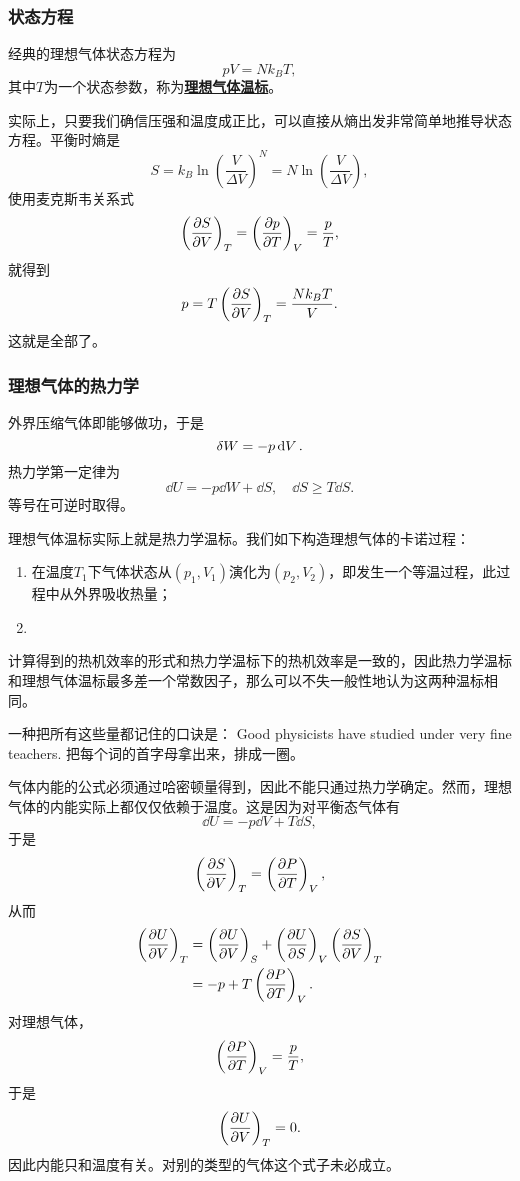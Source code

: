 \documentclass[hyperref, UTF8, a4paper]{ctexart}
\newcommand{\concept}[1]{\underline{\textbf{#1}}}
\begin{document}
\subsubsection{状态方程}

经典的理想气体状态方程为
\begin{equation}
    pV=N k_B T,
\end{equation}
其中$T$为一个状态参数，称为\concept{理想气体温标}。

实际上，只要我们确信压强和温度成正比，可以直接从熵出发非常简单地推导状态方程。平衡时熵是
\[
    S = k_B \ln \left(\frac{V}{\Delta V}\right)^N = N \ln \left( \frac{V}{\Delta V} \right),
\]
使用麦克斯韦关系式
\[
    \left( \pdv{S}{V} \right)_T = \left( \pdv{p}{T} \right)_V = \frac{p}{T},
\]
就得到
\[
    p = T \left( \pdv{S}{V} \right)_T = \frac{N k_B T}{V}.
\]
这就是全部了。

\subsubsection{理想气体的热力学}

外界压缩气体即能够做功，于是
\begin{equation}
    \var{W} = - p \dd{V}.
\end{equation}
热力学第一定律为
\begin{equation}
    \dd{U} = - p \dd{W} + \dd{S}, \quad \dd{S} \geq T \dd{S}.
\end{equation}
等号在可逆时取得。

理想气体温标实际上就是热力学温标。我们如下构造理想气体的卡诺过程：
\begin{enumerate}
    \item 在温度$T_1$下气体状态从$(p_1, V_1)$演化为$(p_2, V_2)$，即发生一个等温过程，此过程中从外界吸收热量；
    \item 
\end{enumerate}

计算得到的热机效率的形式和热力学温标下的热机效率是一致的，因此热力学温标和理想气体温标最多差一个常数因子，那么可以不失一般性地认为这两种温标相同。

一种把所有这些量都记住的口诀是：
Good physicists have studied under very fine teachers.
把每个词的首字母拿出来，排成一圈。

气体内能的公式必须通过哈密顿量得到，因此不能只通过热力学确定。然而，理想气体的内能实际上都仅仅依赖于温度。这是因为对平衡态气体有
\[
    \dd{U} = - p \dd{V} + T \dd{S},
\]
于是
\[
    \left(\pdv{S}{V}\right)_T = \left(\pdv{P}{T}\right)_V,
\]
从而
\[
    \begin{aligned}
        \left(\pdv{U}{V}\right)_T &= \left(\pdv{U}{V}\right)_S + \left(\pdv{U}{S}\right)_V \left(\pdv{S}{V}\right)_T \\
        &= - p + T \left(\pdv{P}{T}\right)_V.
    \end{aligned}
\]
对理想气体，
\[
    \left(\pdv{P}{T}\right)_V = \frac{p}{T},
\]
于是
\[
    \left(\pdv{U}{V}\right)_T = 0.
\]
因此内能只和温度有关。对别的类型的气体这个式子未必成立。
\end{document}
